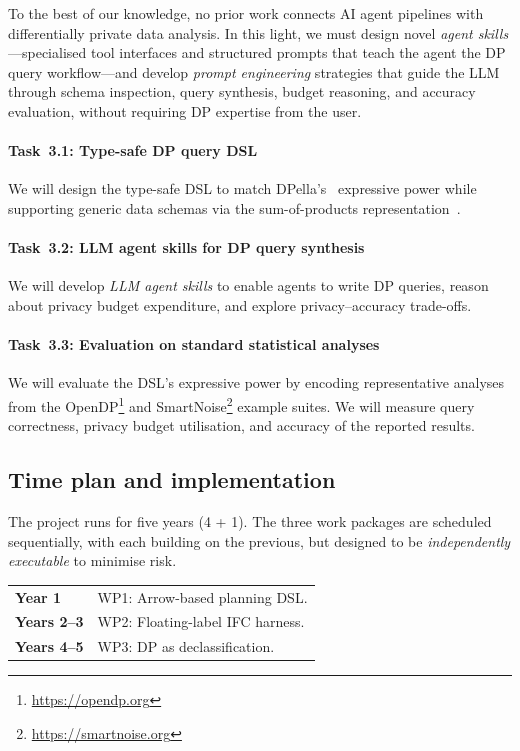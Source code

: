 \documentclass{kaw}
\begin{document}
To the best of our knowledge, no prior work connects AI agent pipelines with
differentially private data analysis. 
%
In this light, we must design novel \emph{agent skills}---specialised tool
interfaces and structured prompts that teach the agent the DP query
workflow---and develop \emph{prompt engineering} strategies that guide the LLM
through schema inspection, query synthesis, budget reasoning, and accuracy
evaluation, without requiring DP expertise from the user.

\paragraph{Task~3.1: Type-safe DP query DSL}
We will design the type-safe DSL to match DPella's~\cite{LoboVesga:SP20,LoboVesga:TOPLAS21}
expressive power while supporting generic data schemas via the
sum-of-products representation~\cite{deVries:SOP:WGP14}. 

\paragraph{Task~3.2: LLM agent skills for DP query synthesis}
We will develop \emph{LLM agent skills} 
to enable agents to write DP queries, 
reason about privacy budget expenditure, and explore
privacy--accuracy trade-offs. 
%

\paragraph{Task~3.3: Evaluation on standard statistical analyses}
We will evaluate the DSL's expressive power by encoding representative analyses
from the OpenDP\footnote{\url{https://opendp.org}} and
SmartNoise\footnote{\url{https://smartnoise.org}} example suites.
%
We will measure query correctness, privacy budget utilisation, and
accuracy of the reported results. 

\subsection{Time plan and implementation}

The project runs for five years (4 + 1).
%
The three work packages are scheduled sequentially, with each building on the
previous, but designed to be \emph{independently executable} to minimise risk.

\noindent\begin{tabular}{lp{9cm}}
\textbf{Year 1}   & WP1: Arrow-based planning DSL. \\[2pt]
\textbf{Years 2--3} & WP2: Floating-label IFC harness. \\[2pt]
\textbf{Years 4--5} & WP3: DP as declassification. \\
\end{tabular}
\end{document}

